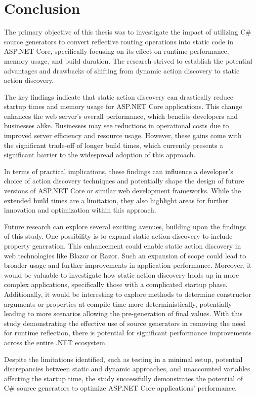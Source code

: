 \chapter{Conclusion}

The primary objective of this thesis was to investigate the impact of utilizing C\# source generators to convert reflective routing operations into static code in ASP.NET Core, specifically focusing on its effect on runtime performance, memory usage, and build duration. The research strived to establish the potential advantages and drawbacks of shifting from dynamic action discovery to static action discovery.

The key findings indicate that static action discovery can drastically reduce startup times and memory usage for ASP.NET Core applications. This change enhances the web server's overall performance, which benefits developers and businesses alike. Businesses may see reductions in operational costs due to improved server efficiency and resource usage. However, these gains come with the significant trade-off of longer build times, which currently presents a significant barrier to the widespread adoption of this approach.

In terms of practical implications, these findings can influence a developer's choice of action discovery techniques and potentially shape the design of future versions of ASP.NET Core or similar web development frameworks. While the extended build times are a limitation, they also highlight areas for further innovation and optimization within this approach.

Future research can explore several exciting avenues, building upon the findings of this study. One possibility is to expand static action discovery to include property generation. This enhancement could enable static action discovery in web technologies like Blazor or Razor. Such an expansion of scope could lead to broader usage and further improvements in application performance. Moreover, it would be valuable to investigate how static action discovery holds up in more complex applications, specifically those with a complicated startup phase. Additionally, it would be interesting to explore methods to determine constructor arguments or properties at compile-time more deterministically, potentially leading to more scenarios allowing the pre-generation of final values. With this study demonstrating the effective use of source generators in removing the need for runtime reflection, there is potential for significant performance improvements across the entire .NET ecosystem.

Despite the limitations identified, such as testing in a minimal setup, potential discrepancies between static and dynamic approaches, and unaccounted variables affecting the startup time, the study successfully demonstrates the potential of C\# source generators to optimize ASP.NET Core applications' performance.